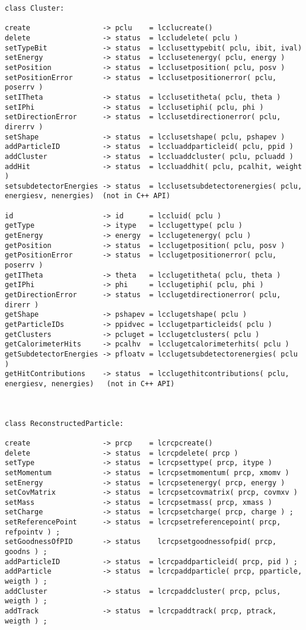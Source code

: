 \begin{scriptsize}
\begin{verbatim}
class Cluster:

create                 -> pclu    = lcclucreate()
delete                 -> status  = lccludelete( pclu )
setTypeBit             -> status  = lcclusettypebit( pclu, ibit, ival)
setEnergy              -> status  = lcclusetenergy( pclu, energy )
setPosition            -> status  = lcclusetposition( pclu, posv )
setPositionError       -> status  = lcclusetpositionerror( pclu, poserrv )
setITheta              -> status  = lcclusetitheta( pclu, theta )
setIPhi                -> status  = lcclusetiphi( pclu, phi )
setDirectionError      -> status  = lcclusetdirectionerror( pclu, direrrv )
setShape               -> status  = lcclusetshape( pclu, pshapev )
addParticleID          -> status  = lccluaddparticleid( pclu, ppid )
addCluster             -> status  = lccluaddcluster( pclu, pcluadd )
addHit                 -> status  = lccluaddhit( pclu, pcalhit, weight )
setsubdetectorEnergies -> status  = lcclusetsubdetectorenergies( pclu, energiesv, nenergies)  (not in C++ API)

id                     -> id      = lccluid( pclu )
getType                -> itype   = lcclugettype( pclu )
getEnergy              -> energy  = lcclugetenergy( pclu )
getPosition            -> status  = lcclugetposition( pclu, posv )
getPositionError       -> status  = lcclugetpositionerror( pclu, poserrv )
getITheta              -> theta   = lcclugetitheta( pclu, theta )
getIPhi                -> phi     = lcclugetiphi( pclu, phi )
getDirectionError      -> status  = lcclugetdirectionerror( pclu, direrr )
getShape               -> pshapev = lcclugetshape( pclu )
getParticleIDs         -> ppidvec = lcclugetparticleids( pclu )
getClusters            -> pcluget = lcclugetclusters( pclu )
getCalorimeterHits     -> pcalhv  = lcclugetcalorimeterhits( pclu )
getSubdetectorEnergies -> pfloatv = lcclugetsubdetectorenergies( pclu )
getHitContributions    -> status  = lcclugethitcontributions( pclu, energiesv, nenergies)   (not in C++ API)



class ReconstructedParticle:

create                 -> prcp    = lcrcpcreate()
delete                 -> status  = lcrcpdelete( prcp )
setType                -> status  = lcrcpsettype( prcp, itype )
setMomentum            -> status  = lcrcpsetmomentum( prcp, xmomv )
setEnergy              -> status  = lcrcpsetenergy( prcp, energy )
setCovMatrix           -> status  = lcrcpsetcovmatrix( prcp, covmxv )
setMass                -> status  = lcrcpsetmass( prcp, xmass )
setCharge              -> status  = lcrcpsetcharge( prcp, charge ) ;
setReferencePoint      -> status  = lcrcpsetreferencepoint( prcp, refpointv ) ;
setGoodnessOfPID       -> status    lcrcpsetgoodnessofpid( prcp, goodns ) ;
addParticleID          -> status  = lcrcpaddparticleid( prcp, pid ) ;
addParticle            -> status  = lcrcpaddparticle( prcp, pparticle, weigth ) ;
addCluster             -> status  = lcrcpaddcluster( prcp, pclus, weigth ) ;
addTrack               -> status  = lcrcpaddtrack( prcp, ptrack, weigth ) ;


\end{verbatim}
\end{scriptsize}
